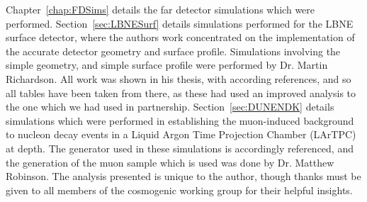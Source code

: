 \begin{declaration}
  Chapter~\ref{chap:FDSims} details the far detector simulations which were performed. Section~\ref{sec:LBNESurf} details simulations performed for the LBNE surface detector, where the authors work concentrated on the implementation of the accurate detector geometry and surface profile. Simulations involving the simple geometry, and simple surface profile were performed by Dr. Martin Richardson. All work was shown in his thesis, with according references, and so all tables have been taken from there, as these had used an improved analysis to the one which we had used in partnership. Section~\ref{sec:DUNENDK} details simulations which were performed in establishing the muon-induced background to nucleon decay events in a Liquid Argon Time Projection Chamber (LArTPC) at depth. The generator used in these simulations is accordingly referenced, and the generation of the muon sample which is used was done by Dr. Matthew Robinson. The analysis presented is unique to the author, though thanks must be given to all members of the cosmogenic working group for their helpful insights. \\
  

\end{declaration}


